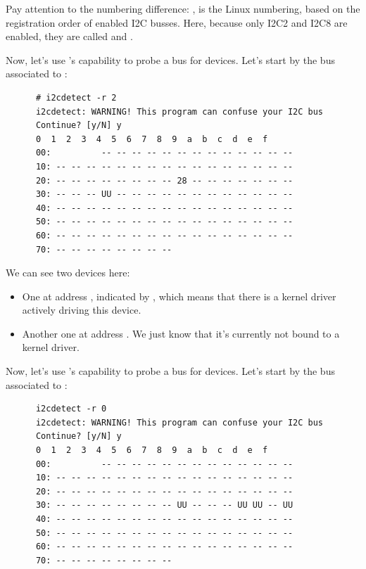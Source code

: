       Pay attention to the numbering difference: ,
       is the Linux numbering, based on the registration order
      of enabled I2C busses. Here, because only I2C2 and I2C8 are enabled,
      they are called  and .
\fi

\if{}
      Now, let's use 's capability to probe a bus for devices.
      Let's start by the bus associated to :

      \begin{verbatim}
      # i2cdetect -r 2
      i2cdetect: WARNING! This program can confuse your I2C bus
      Continue? [y/N] y
      0  1  2  3  4  5  6  7  8  9  a  b  c  d  e  f
      00:          -- -- -- -- -- -- -- -- -- -- -- -- --
      10: -- -- -- -- -- -- -- -- -- -- -- -- -- -- -- --
      20: -- -- -- -- -- -- -- -- 28 -- -- -- -- -- -- --
      30: -- -- -- UU -- -- -- -- -- -- -- -- -- -- -- --
      40: -- -- -- -- -- -- -- -- -- -- -- -- -- -- -- --
      50: -- -- -- -- -- -- -- -- -- -- -- -- -- -- -- --
      60: -- -- -- -- -- -- -- -- -- -- -- -- -- -- -- --
      70: -- -- -- -- -- -- -- --
      \end{verbatim}

      We can see two devices here:
      \begin{itemize}
      \item One at address , indicated by ,
            which means that there is a kernel driver actively
            driving this device.
      \item Another one at address . We just know that
            it's currently not bound to a kernel driver.
      \end{itemize}
\fi
\if{}
      Now, let's use 's capability to probe a bus for devices.
      Let's start by the bus associated to :

      \begin{verbatim}
      i2cdetect -r 0
      i2cdetect: WARNING! This program can confuse your I2C bus
      Continue? [y/N] y
      0  1  2  3  4  5  6  7  8  9  a  b  c  d  e  f
      00:          -- -- -- -- -- -- -- -- -- -- -- -- -- 
      10: -- -- -- -- -- -- -- -- -- -- -- -- -- -- -- -- 
      20: -- -- -- -- -- -- -- -- -- -- -- -- -- -- -- -- 
      30: -- -- -- -- -- -- -- -- UU -- -- -- UU UU -- UU 
      40: -- -- -- -- -- -- -- -- -- -- -- -- -- -- -- -- 
      50: -- -- -- -- -- -- -- -- -- -- -- -- -- -- -- -- 
      60: -- -- -- -- -- -- -- -- -- -- -- -- -- -- -- -- 
      70: -- -- -- -- -- -- -- -- 
      \end{verbatim}

